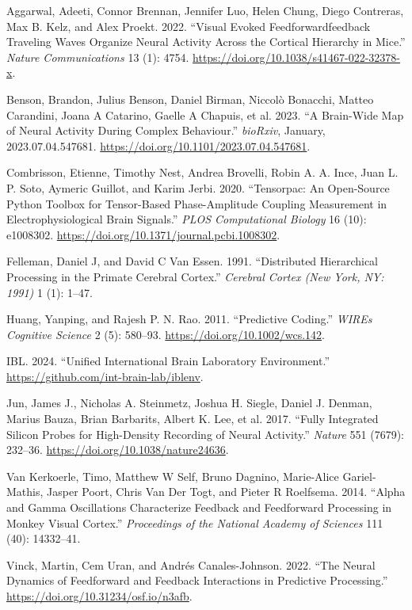 \documentclass[
  letterpaper,
  DIV=11,
  numbers=noendperiod]{scrartcl}
\newlength{\cslhangindent}
\newenvironment{CSLReferences}[2] %
 {\begin{list}{}{%
  \setlength{\itemindent}{0pt}
  \setlength{\leftmargin}{0pt}
  \setlength{\parsep}{0pt}
  \ifodd #1
   \setlength{\leftmargin}{\cslhangindent}
   \setlength{\itemindent}{-1\cslhangindent}
  \fi
  \setlength{\itemsep}{#2\baselineskip}}}
 {\end{list}}
\begin{document}
\label{refs}
\begin{CSLReferences}{1}{0}
Aggarwal, Adeeti, Connor Brennan, Jennifer Luo, Helen Chung, Diego
Contreras, Max B. Kelz, and Alex Proekt. 2022. {``Visual Evoked
Feedforward{\textendash}feedback Traveling Waves Organize Neural
Activity Across the Cortical Hierarchy in Mice.''} \emph{Nature
Communications} 13 (1): 4754.
\url{https://doi.org/10.1038/s41467-022-32378-x}.

Benson, Brandon, Julius Benson, Daniel Birman, Niccolò Bonacchi, Matteo
Carandini, Joana A Catarino, Gaelle A Chapuis, et al. 2023. {``A
Brain-Wide Map of Neural Activity During Complex Behaviour.''}
\emph{bioRxiv}, January, 2023.07.04.547681.
\url{https://doi.org/10.1101/2023.07.04.547681}.

Combrisson, Etienne, Timothy Nest, Andrea Brovelli, Robin A. A. Ince,
Juan L. P. Soto, Aymeric Guillot, and Karim Jerbi. 2020. {``Tensorpac:
An Open-Source Python Toolbox for Tensor-Based Phase-Amplitude Coupling
Measurement in Electrophysiological Brain Signals.''} \emph{PLOS
Computational Biology} 16 (10): e1008302.
\url{https://doi.org/10.1371/journal.pcbi.1008302}.

Felleman, Daniel J, and David C Van Essen. 1991. {``Distributed
Hierarchical Processing in the Primate Cerebral Cortex.''}
\emph{Cerebral Cortex (New York, NY: 1991)} 1 (1): 1--47.

Huang, Yanping, and Rajesh P. N. Rao. 2011. {``Predictive Coding.''}
\emph{WIREs Cognitive Science} 2 (5): 580--93.
\url{https://doi.org/10.1002/wcs.142}.

IBL. 2024. {``Unified International Brain Laboratory Environment.''}
\url{https://github.com/int-brain-lab/iblenv}.

Jun, James J., Nicholas A. Steinmetz, Joshua H. Siegle, Daniel J.
Denman, Marius Bauza, Brian Barbarits, Albert K. Lee, et al. 2017.
{``Fully Integrated Silicon Probes for High-Density Recording of Neural
Activity.''} \emph{Nature} 551 (7679): 232--36.
\url{https://doi.org/10.1038/nature24636}.

Van Kerkoerle, Timo, Matthew W Self, Bruno Dagnino, Marie-Alice
Gariel-Mathis, Jasper Poort, Chris Van Der Togt, and Pieter R Roelfsema.
2014. {``Alpha and Gamma Oscillations Characterize Feedback and
Feedforward Processing in Monkey Visual Cortex.''} \emph{Proceedings of
the National Academy of Sciences} 111 (40): 14332--41.

Vinck, Martin, Cem Uran, and Andrés Canales-Johnson. 2022. {``The Neural
Dynamics of Feedforward and Feedback Interactions in Predictive
Processing.''} \url{https://doi.org/10.31234/osf.io/n3afb}.

\end{CSLReferences}
\end{document}

